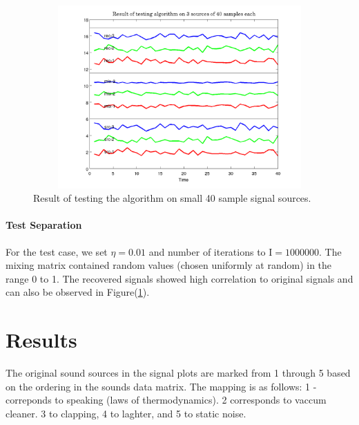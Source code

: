\documentclass[11pt]{article}
\begin{document}
\begin{figure}[hb!]
\begin{center}
	\includegraphics[width=16.0cm, height=7.0cm]{../plots/icaTestCheckImage.png}
\end{center}
\caption{Result of testing the algorithm on small 40 sample signal sources.}\label{fig:test1}
\end{figure}

\paragraph{Test Separation} 
For the test case, we set $\eta = 0.01$ and number of iterations to I$ = 1000000$. The mixing matrix contained random values (chosen uniformly at random) in the range 0 to 1. The recovered signals showed high correlation to original signals and can also be observed in Figure(\ref{fig:test1}).

\section{Results}
The original sound sources in the signal plots are marked from 1 through 5 based on the ordering in the sounds data matrix. The mapping is as follows: 1 - correponds to speaking (laws of thermodynamics). 2 corresponds to vaccum cleaner. 3 to clapping, 4 to laghter, and 5 to static noise.
\end{document}
